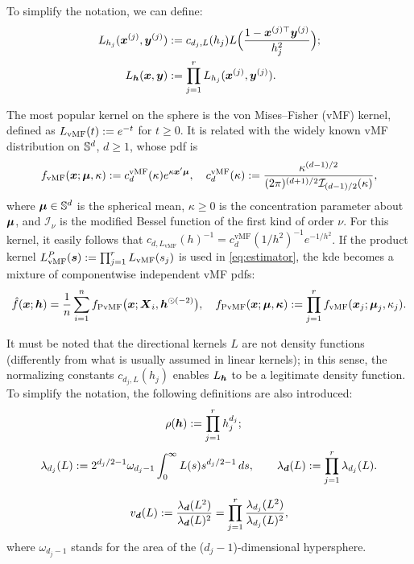 \documentclass[oneside,11pt]{article}
\begin{document}
To simplify the notation, we can define:
\begin{align*}
    L_{h_j} (\boldsymbol{x}^{(j)},\boldsymbol{y}^{(j)}) &:= c_{d_j,L}(h_j) L \Big( \frac{1 - \boldsymbol{x}^{(j)\top} \boldsymbol{y}^{(j)}}{h_j^2} \Big);\\
    L_{{\boldsymbol{h}}} (\boldsymbol{x},\boldsymbol{y}) &:= \prod_{j=1}^r L_{h_j} (\boldsymbol{x}^{(j)},\boldsymbol{y}^{(j)}).
\end{align*}

The most popular kernel on the sphere is the von Mises--Fisher (vMF) kernel, defined as $L_{\mathrm{vMF}}(t):= e^{-t}$ for $t\geq0$. It is related with the widely known vMF distribution on $\mathbb{S}^{d}$, $d\geq 1$, whose pdf is 
\begin{align*}
    f_{\mathrm{vMF}}(\boldsymbol{x};\boldsymbol\mu,\kappa):= c^\mathrm{vMF}_{d}(\kappa) e^{\kappa\boldsymbol{x}'\boldsymbol\mu},\quad c_{d}^\mathrm{vMF}(\kappa):=\frac{\kappa^{(d-1)/2}}{(2\pi)^{(d+1)/2}\mathcal{I}_{(d-1)/2}(\kappa)},
\end{align*}
where $\boldsymbol\mu\in\mathbb{S}^{d}$ is the spherical mean, $\kappa\geq0$ is the concentration parameter about $\boldsymbol\mu$, and $\mathcal{I}_\nu$ is the modified Bessel function of the first kind of order $\nu$. For this kernel, it easily follows that $c_{d,L_{\mathrm{vMF}}}(h)^{-1}=c_{d}^{\mathrm{vMF}}(1/h^2)^{-1}e^{-1/h^2}$. If the product kernel $L_\mathrm{vMF}^P(\boldsymbol{s}):=\prod_{j=1}^r L_\mathrm{vMF}(s_j)$ is used in \eqref{eq:estimator}, the kde becomes a mixture of componentwise independent vMF pdfs:
\begin{align}
    \hat f(\boldsymbol{x};{\boldsymbol{h}})=\frac{1}{n}\sum_{i=1}^n f_{\mathrm{PvMF}}\big(\boldsymbol{x};\boldsymbol{X}_i,{\boldsymbol{h}}^{\odot(-2)}\big),\quad f_{\mathrm{PvMF}}(\boldsymbol{x};\boldsymbol\mu,\boldsymbol\kappa):=\prod_{j=1}^r f_{\mathrm{vMF}}(\boldsymbol{x}_j;\boldsymbol\mu_j,\kappa_j).\label{eq:pmvf}
\end{align}

It must be noted that the directional kernels $L$ are not density functions (differently from what is usually assumed in linear kernels); in this sense, the normalizing constants $c_{d_j,L}(h_j)$ enables $L_{{\boldsymbol{h}}}$ to be a legitimate density function. To simplify the notation, the following definitions are also introduced:
\begin{align*}
    \rho({\boldsymbol{h}}) &:= \prod_{j = 1}^{r} h_j^{d_j};
\end{align*}
\[
\lambda_{d_j}(L)
:=
2^{d_j/2-1}\omega_{d_j-1}
\int_0^\infty L(s)s^{d_j/2-1}\,ds,
\qquad
\lambda_{\boldsymbol{d}}(L)
:=
\prod_{j=1}^r \lambda_{d_j}(L).
\]

\[
v_{\boldsymbol{d}}(L)
:=
\frac{\lambda_{\boldsymbol{d}}(L^2)}{\lambda_{\boldsymbol{d}}(L)^2}
=
\prod_{j=1}^r
\frac{\lambda_{d_j}(L^2)}{\lambda_{d_j}(L)^2},
\]
where $\omega_{d_j-1}$ stands for the area of the ($d_j-1$)-dimensional hypersphere.
\end{document}
